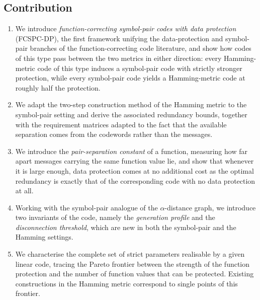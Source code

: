 \documentclass[11pt,draftclsnofoot,journal,onecolumn]{IEEEtran}
\begin{document}
 \subsection{Contribution}
    \begin{enumerate}
    \item We introduce \emph{function-correcting symbol-pair codes with data protection} (FCSPC-DP), the first framework unifying the data-protection and symbol-pair branches of the function-correcting code literature, and show how codes of this type pass between the two metrics in either direction: every Hamming-metric code of this type induces a symbol-pair code with strictly stronger protection, while every symbol-pair code yields a Hamming-metric code at roughly half the protection.

    \item We adapt the two-step construction method of the Hamming metric to the symbol-pair setting and derive the associated redundancy bounds, together with the requirement matrices adapted to the fact that the available separation comes from the codewords rather than the messages.

    \item We introduce the \emph{pair-separation constant} of a function, measuring how far apart messages carrying the same function value lie, and show that whenever it is large enough, data protection comes at no additional cost as the optimal redundancy is exactly that of the corresponding code with no data protection at all.

    \item Working with the symbol-pair analogue of the $\alpha$-distance graph, we introduce two invariants of the code, namely the \emph{generation profile} and the \emph{disconnection threshold}, which are new in both the symbol-pair and the Hamming settings.

    \item We characterise the complete set of strict parameters realisable by a given linear code, tracing the Pareto frontier between the strength of the function protection and the number of function values that can be protected. Existing constructions in the Hamming metric correspond to single points of this frontier.



\end{enumerate}
\end{document}
